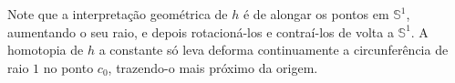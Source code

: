 Note que a interpretação geométrica de $h$ é de alongar os pontos em $\mathbb{S}^1$, aumentando o seu raio, e depois rotacioná-los e contraí-los de volta a $\mathbb{S}^1$. A homotopia de $h$ a constante só leva deforma continuamente a circunferência de raio $1$ no ponto $c_0$, trazendo-o mais próximo da origem.

